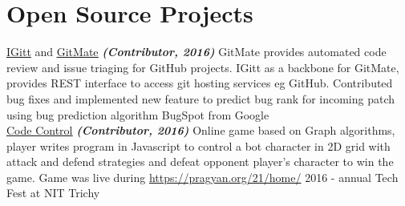 \documentclass[]{deedy-resume-openfont}
\begin{document}
\begin{minipage}[t]{0.66\textwidth}
\section{Open Source Projects}
\textbullet{} \href{https://gitlab.com/gitmate/open-source/IGitt}{\underline {IGitt}} and \href{https://gitlab.com/gitmate/open-source/gitmate-2}{\underline {GitMate}} {\footnotesize \textit{\textbf{(Contributor, 2016) }}} \textemdash GitMate provides automated code review and issue triaging for GitHub projects. IGitt as a backbone for GitMate, provides REST interface to access git hosting services eg GitHub. Contributed bug fixes and implemented new feature to predict bug rank for incoming patch using bug prediction algorithm BugSpot from Google \\
\textbullet{} \href{https://github.com/ash7594/code-control/commits?author=tushar-rishav}{\underline {Code Control}} {\footnotesize \textit{\textbf{(Contributor, 2016) }}} \textemdash Online game based on Graph algorithms, player writes program in Javascript to control a bot character in 2D grid with attack and defend strategies and defeat opponent player’s character to win the game. Game was live during \href{Pragyan}{https://pragyan.org/21/home/} 2016 - annual Tech Fest at NIT Trichy
\sectionsep

\end{minipage} 
\end{document}
